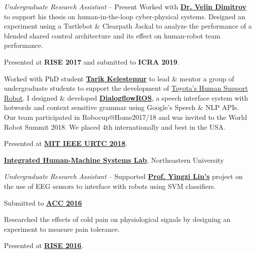 \documentclass[letterpaper,MMMyyyy,nonstopmode]{simpleresumecv}
\begin{document}
\begin{Body}
\Gap
\textit{Undergraduate Research Assistant}
\hfill
{} -- Present
\BulletItem 
Worked with \textbf{\href{https://www.linkedin.com/in/velin-dimitrov/}{Dr. Velin Dimitrov}} to support his thesis on human-in-the-loop cyber-physical systems. Designed an experiment using a Turtlebot \& Clearpath Jackal to analyze the performance of a blended shared control architecture and its effect on human-robot team performance.
\begin{Detail}
\Item
Presented at \textbf{RISE 2017} and submitted to \textbf{ICRA 2019}.
\end{Detail}
\BulletItem 
Worked with PhD student \href{http://kelestemur.com/}{\textbf{Tarik Kelestemur}} to lead \& mentor a group of undergraduate students to support the development of \href{http://www.toyota-global.com/innovation/partner_robot/family_2.html}{Toyota's Human Support Robot}. I designed \& developed \href{http://wiki.ros.org/dialogflow_ros}{\textbf{DialogflowROS}}, a speech interface system with hotwords and context sensitive grammar using Google's Speech \& NLP APIs. Our team participated in Robocup@Home2017/18 and was invited to the World Robot Summit 2018. We placed 4th internationally and best in the USA.
\begin{Detail}
\Item
Presented at \href{http://ieee.scripts.mit.edu/conference/}{\textbf{MIT IEEE URTC 2018}}.
\end{Detail}
\SectionSpace


\Entry
\href{http://www1.coe.neu.edu/~yilin/ihmslab.html}
{\textbf{Integrated Human-Machine Systems Lab}},
Northeastern University

\Gap
\textit{Undergraduate Research Assistant}
\hfill
{} --
\BulletItem
Supported \href{http://www1.coe.neu.edu/~yilin/director.html}{\textbf{Prof. Yingzi Lin's}} project on the use of EEG sensors to interface with robots using SVM classifiers. 
\begin{Detail}
\Item
Submitted to \href{http://acc2016.a2c2.org/}{\textbf{ACC 2016}}
\end{Detail}
\BulletItem
Researched the effects of cold pain on physiological signals by designing an experiment to measure pain tolerance.
\begin{Detail}
\Item
Presented at \href{https://www.northeastern.edu/rise/}{\textbf{RISE 2016}}. 
\end{Detail}



\end{Body}
\end{document}
